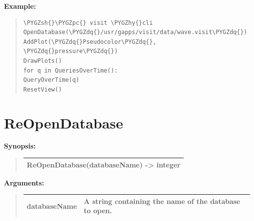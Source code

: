 \documentclass[letterpaper,10pt,english]{sphinxmanual}
\def\PYGZsh{\char`\#}
\def\PYGZpc{\char`\%}
\def\PYGZhy{\char`\-}
\def\PYGZdq{\char`\"}
\begin{document}
\begin{DUlineblock}{0em}
\item[] 
\end{DUlineblock}

\begin{DUlineblock}{0em}
\item[] \textbf{Example:}
\item[] 
\end{DUlineblock}
\begin{quote}

\begin{Verbatim}[commandchars=\\\{\}]
\PYGZsh{}\PYGZpc{} visit \PYGZhy{}cli
OpenDatabase(\PYGZdq{}/usr/gapps/visit/data/wave.visit\PYGZdq{})
AddPlot(\PYGZdq{}Pseudocolor\PYGZdq{}, \PYGZdq{}pressure\PYGZdq{})
DrawPlots()
for q in QueriesOverTime():
QueryOverTime(q)
ResetView()
\end{Verbatim}
\end{quote}


\section{ReOpenDatabase}
\label{functions:reopendatabase}
\begin{DUlineblock}{0em}
\item[] \textbf{Synopsis:}
\end{DUlineblock}
\begin{quote}

\begin{tabulary}{\linewidth}{|L|}
\hline

ReOpenDatabase(databaseName) -\textgreater{} integer
\\
\hline\end{tabulary}

\end{quote}

\begin{DUlineblock}{0em}
\item[] 
\item[] \textbf{Arguments:}
\end{DUlineblock}
\begin{quote}

\begin{tabulary}{\linewidth}{|L|L|}
\hline

databaseName
 & 
A string containing the name of the database to open.
\\
\hline\end{tabulary}

\end{quote}
\end{document}
